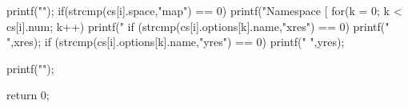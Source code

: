 \begin{DoxyCodeInclude}
{{{                printf("\n");
    }
    if(strcmp(cs[i].space,"map") == 0){
                printf("Namespace [%
                for(k = 0; k < cs[i].num; k++){
                        printf("%
                        if (strcmp(cs[i].options[k].name,"xres") == 0) printf("%
      \n",xres);
                        if (strcmp(cs[i].options[k].name,"yres") == 0) printf("%
      \n",yres);
    }
    }

  }
        printf("\n");

  return 0;
}

\end{DoxyCodeInclude}
 